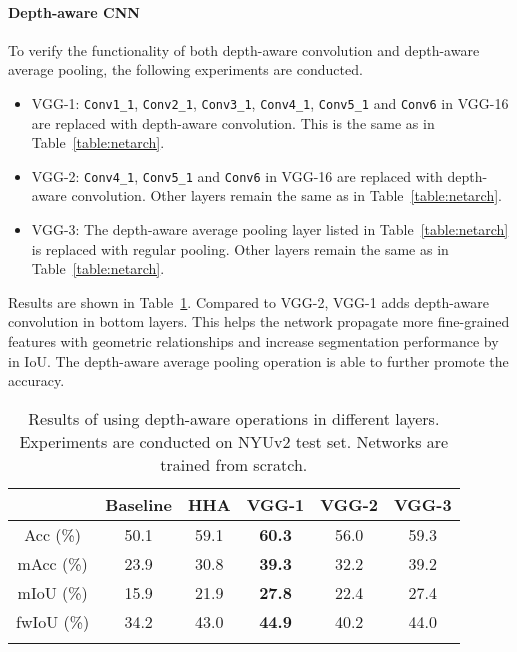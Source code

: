 \paragraph{\bfseries{Depth-aware CNN}}
To verify the functionality of both depth-aware convolution and depth-aware average pooling, the following experiments are conducted.
\begin{itemize}
\item VGG-1: \texttt{Conv1\_1}, \texttt{Conv2\_1}, \texttt{Conv3\_1}, \texttt{Conv4\_1}, \texttt{Conv5\_1} and \texttt{Conv6} in VGG-16 are replaced with depth-aware convolution. This is the same as in Table~\ref{table:netarch}.
\item VGG-2: \texttt{Conv4\_1}, \texttt{Conv5\_1} and \texttt{Conv6} in VGG-16 are replaced with depth-aware convolution. Other layers remain the same as in Table~\ref{table:netarch}.
\item VGG-3: The depth-aware average pooling layer listed in Table~\ref{table:netarch} is replaced with regular pooling. Other layers remain the same as in Table~\ref{table:netarch}.
\end{itemize}
Results are shown in Table~\ref{table:depthconv}. Compared to VGG-2, VGG-1 adds depth-aware convolution in bottom layers. This helps the network propagate more fine-grained features with geometric relationships and increase segmentation performance by  in IoU. The depth-aware average pooling operation is able to further promote the accuracy.   

\begin{table}
	\begin{center}
		\begin{tabular}{c|cc|ccc}
			\Xhline{3\arrayrulewidth}
			& Baseline& HHA& VGG-1    & VGG-2 & VGG-3  \\
			\hline
			Acc (\%)&50.1  &59.1&\bf{60.3} & 56.0  & 59.3  \\
			mAcc (\%)&23.9 &30.8&\bf{39.3} & 32.2  & 39.2    \\
			mIoU (\%)&15.9 &21.9&\bf{27.8} & 22.4  & 27.4     \\
			fwIoU (\%)&34.2&43.0&\bf{44.9} & 40.2  & 44.0     \\
			\Xhline{3\arrayrulewidth}
		\end{tabular}
	\end{center}
	\caption{Results of using depth-aware operations in different layers. Experiments are conducted on NYUv2 test set. Networks are trained from scratch.}
	\vspace{-10pt}
	\label{table:depthconv}
\end{table}

